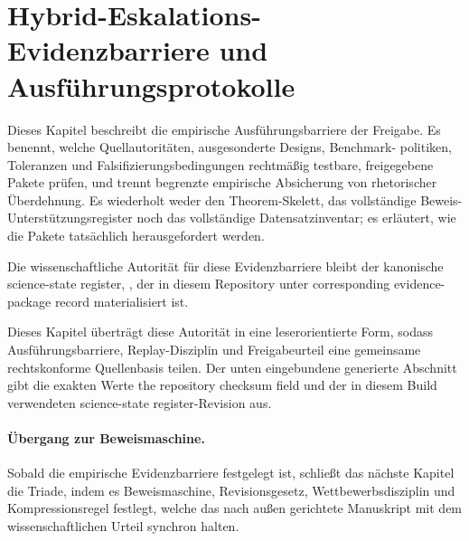\section{Hybrid-Eskalations-Evidenzbarriere und Ausführungsprotokolle}
\label{sec:oc-core-1-3-empirical-execution-protocols}

Dieses Kapitel beschreibt die empirische Ausführungsbarriere der Freigabe.
Es benennt, welche Quellautoritäten, ausgesonderte Designs, Benchmark-
politiken, Toleranzen und Falsifizierungsbedingungen rechtmäßig testbare,
freigegebene Pakete prüfen, und trennt begrenzte empirische Absicherung von
rhetorischer Überdehnung. Es wiederholt weder den Theorem-Skelett, das
vollständige Beweis-Unterstützungsregister noch das vollständige
Datensatzinventar; es erläutert, wie die Pakete tatsächlich herausgefordert
werden.

Die wissenschaftliche Autorität für diese Evidenzbarriere bleibt der
kanonische science-state register, , der in diesem
Repository unter
corresponding evidence-package record
materialisiert ist.

Dieses Kapitel überträgt diese Autorität in eine leserorientierte Form,
sodass Ausführungsbarriere, Replay-Disziplin und Freigabeurteil eine
gemeinsame rechtskonforme Quellenbasis teilen. Der unten eingebundene generierte
Abschnitt gibt die exakten Werte the repository checksum field und
 der in diesem Build verwendeten science-state register-Revision aus.

\begingroup
\small

\endgroup

\paragraph{Übergang zur Beweismaschine.}
Sobald die empirische Evidenzbarriere festgelegt ist, schließt das nächste
Kapitel die Triade, indem es Beweismaschine, Revisionsgesetz,
Wettbewerbsdisziplin und Kompressionsregel festlegt, welche das nach außen
gerichtete Manuskript mit dem wissenschaftlichen Urteil synchron halten.
